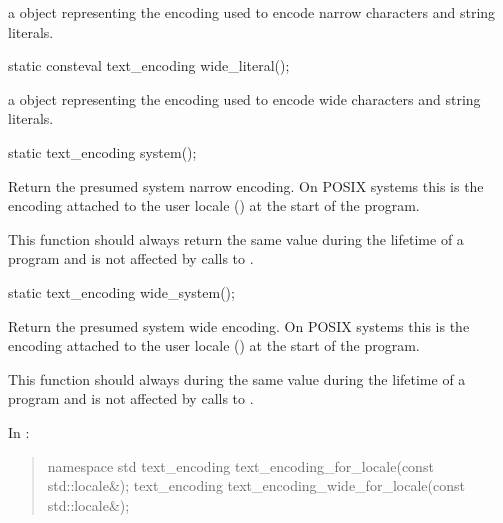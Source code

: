 \documentclass{wg21}
\begin{document}
\begin{addedblock}
\begin{itemdescr}
    \returns a  object representing the encoding used to encode narrow characters and string literals.
\end{itemdescr}

\begin{itemdecl}
static consteval text_encoding wide_literal();
\end{itemdecl}

\begin{itemdescr}
    \returns a  object representing the encoding used to encode wide characters and string literals.
\end{itemdescr}

\begin{itemdecl}
static text_encoding system();
\end{itemdecl}

\begin{itemdescr}
Return the presumed system narrow encoding.
On POSIX systems this is the encoding attached to the user locale () at the start of the program.

\begin{note}
This function should always return the same value during the lifetime of a program and is not affected by calls to .
\end{note}

\end{itemdescr}

\begin{itemdecl}
static text_encoding wide_system();
\end{itemdecl}

\begin{itemdescr}
Return the presumed system wide encoding.
On POSIX systems this is the encoding attached to the user locale () at the start of the program.

\begin{note}
This function should always during the same value during the lifetime of a program and is not affected by calls to .
\end{note}
\end{itemdescr}


\end{addedblock}

In :

\begin{quote}
\begin{addedblock}

\begin{codeblock}

namespace std {
    text_encoding text_encoding_for_locale(const std::locale&);
    text_encoding text_encoding_wide_for_locale(const std::locale&);
}

\end{codeblock}
\end{addedblock}
\end{quote}
\end{document}
